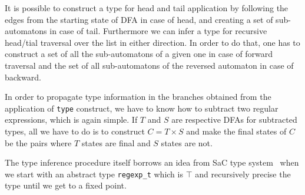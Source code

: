 It is possible to construct a type for head and tail application
by following the edges from the starting state of DFA in case of
head, and creating a set of sub-automatons in case of tail.
Furthermore we can infer a type for recursive head/tial traversal
over the list in either direction.  In order to do that, one has
to construct a set of all the sub-automatons of a given one in 
case of forward traversal and the set of all sub-automatons of
the reversed automaton in case of backward.

In order to propagate type information in the branches obtained from the
application of \verb|type| construct, we have to know how to subtract
two regular expressions, which is again simple.  If $T$ and $S$  are
respective DFAs for subtracted types, all we have to do is to construct
$C = T \times S$ and make the final states of $C$ be the pairs where $T$
states are final and $S$ states are not. 

The type inference procedure itself borrows an idea from SaC type
system~\cite{} when we start with an abstract type \verb|regexp_t|
which is $\top$ and recursively precise the type until we get to
a fixed point.







